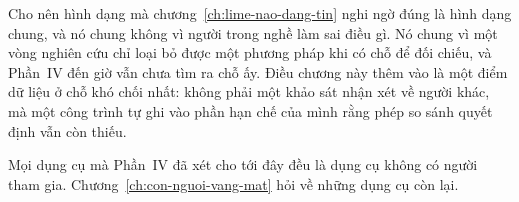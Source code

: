 Cho nên hình dạng mà chương~\ref{ch:lime-nao-dang-tin} nghi ngờ đúng là hình
dạng chung, và nó chung không vì người trong nghề làm sai điều gì. Nó chung vì
một vòng nghiên cứu chỉ loại bỏ được một phương pháp khi có chỗ để đối chiếu,
và Phần~IV đến giờ vẫn chưa tìm ra chỗ ấy. Điều chương này thêm vào là một
điểm dữ liệu ở chỗ khó chối nhất: không phải một khảo sát nhận xét về người
khác, mà một công trình tự ghi vào phần hạn chế của mình rằng phép so sánh
quyết định vẫn còn thiếu.

Mọi dụng cụ mà Phần~IV đã xét cho tới đây đều là dụng cụ không có người tham
gia. Chương~\ref{ch:con-nguoi-vang-mat} hỏi về những dụng cụ còn lại.
